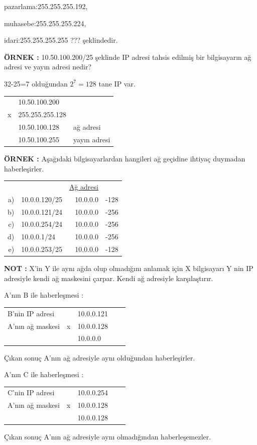 pazarlama:255.255.255.192,
 
  muhasebe:255.255.255.224,
  
   idari:255.255.255.255 ??? şeklindedir. 
   
\textbf{ÖRNEK : } 10.50.100.200/25 şeklinde IP adresi tahsis edilmiş bir bilgisayarın ağ adresi ve yayın adresi nedir? 

32-25=7 olduğundan  $2^7 =128$ tane IP var. 

\begin{tabular}{lll}
 & 10.50.100.200 &\\
x&255.255.255.128& \\
\hline
 & 10.50.100.128 & ağ adresi \\
 & 10.50.100.255 & yayın adresi 
\end{tabular}    

\textbf{ÖRNEK : } Aşağıdaki bilgisayarlardan hangileri ağ geçidine ihtiyaç duymadan haberleşirler. 

\begin{center}
\begin{tabular}{rlrl}
   &               &\underline{Ağ adresi} & \\
a) & 10.0.0.120/25 & 10.0.0.0 & -128 \\
b) & 10.0.0.121/24 & 10.0.0.0 & -256 \\
c) & 10.0.0.254/24 & 10.0.0.0 & -256 \\
d) & 10.0.0.1/24 & 10.0.0.0 & -256 \\
e) & 10.0.0.253/25 & 10.0.0.0 & -128 \\

\end{tabular}

\end{center}

\textbf{NOT : } X'in Y ile aynı ağda olup olmadığını anlamak için X bilgisayarı Y nin IP adresiyle kendi ağ maskesini çarpar. Kendi ağ adresiyle karşılaştırır. 

A'nın B ile haberleşmesi : 

\begin{tabular}{lllll}
B'nin IP adresi & &10.0.0.121 &\\
A'nın ağ maskesi &x&10.0.0.128& \\
\hline 
 & & 10.0.0.0 & \\
\end{tabular} 

Çıkan sonuç A'nın ağ adresiyle aynı olduğundan haberleşirler. 

A'nın C ile haberleşmesi : 

\begin{tabular}{lllll}
C'nin IP adresi & &10.0.0.254 &\\
A'nın ağ maskesi &x&10.0.0.128& \\
\hline 
 & & 10.0.0.128 & \\
\end{tabular} 

Çıkan sonuç A'nın ağ adresiyle aynı olmadığından haberleşemezler.
